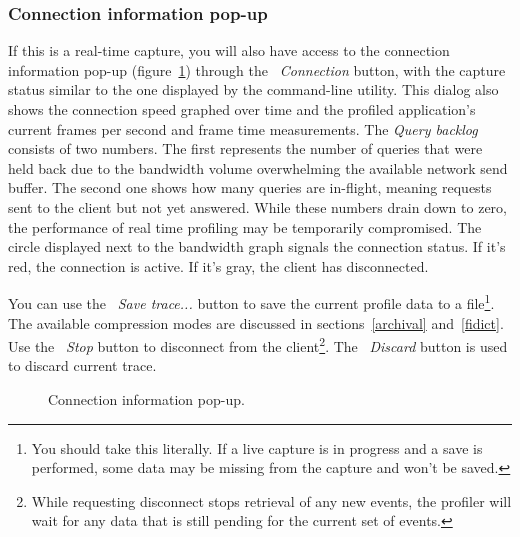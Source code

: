 \documentclass[hidelinks,titlepage,a4paper,twoside]{article}
\begin{document}
\subsubsection{Connection information pop-up}
\label{connectionpopup}

If this is a real-time capture, you will also have access to the connection information pop-up (figure~\ref{connectioninfo}) through the \emph{\faWifi{}~Connection} button, with the capture status similar to the one displayed by the command-line utility. This dialog also shows the connection speed graphed over time and the profiled application's current frames per second and frame time measurements. The \emph{Query backlog} consists of two numbers. The first represents the number of queries that were held back due to the bandwidth volume overwhelming the available network send buffer. The second one shows how many queries are in-flight, meaning requests sent to the client but not yet answered. While these numbers drain down to zero, the performance of real time profiling may be temporarily compromised. The circle displayed next to the bandwidth graph signals the connection status. If it's red, the connection is active. If it's gray, the client has disconnected.

You can use the \faFloppyDisk{}~\emph{Save trace...} button to save the current profile data to a file\footnote{You should take this literally. If a live capture is in progress and a save is performed, some data may be missing from the capture and won't be saved.}. The available compression modes are discussed in sections~\ref{archival} and~\ref{fidict}. Use the \faPlug{}~\emph{Stop} button to disconnect from the client\footnote{While requesting disconnect stops retrieval of any new events, the profiler will wait for any data that is still pending for the current set of events.}. The \faTriangleExclamation{}~\emph{Discard} button is used to discard current trace.

\begin{figure}[h]
\centering{}
\caption{Connection information pop-up.}
\label{connectioninfo}
\end{figure}
\end{document}

